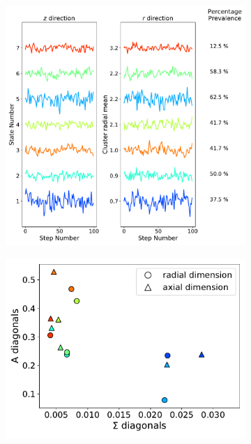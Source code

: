 \documentclass[journal=jpcbfk,manuscript=article]{achemso}
\begin{document}
  \begin{figure}
  \centering
  \begin{subfigure}{0.6\textwidth}
  \includegraphics[width=\textwidth]{common_states_MET.pdf}
  \caption{}\label{fig:common_states_MET_lines}
  \end{subfigure}
  \begin{subfigure}{0.35\textwidth}
  \includegraphics[width=\textwidth]{A_sigma_scatter_MET.pdf}
  \caption{}\label{fig:A_sigma_scatter_MET}

\end{subfigure}
\end{figure}
\end{document}

